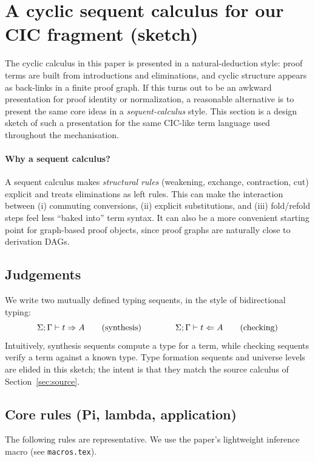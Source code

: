 \section{A cyclic sequent calculus for our CIC fragment (sketch)}
\label{sec:cyclic-sequent}

The cyclic calculus in this paper is presented in a natural-deduction style: proof terms are built from introductions and eliminations, and cyclic structure appears as back-links in a finite proof graph.
If this turns out to be an awkward presentation for proof identity or normalization, a reasonable alternative is to present the same core ideas in a \emph{sequent-calculus} style.
This section is a design sketch of such a presentation for the same CIC-like term language used throughout the mechanisation.

\paragraph{Why a sequent calculus?}
A sequent calculus makes \emph{structural rules} (weakening, exchange, contraction, cut) explicit and treats eliminations as left rules.
This can make the interaction between (i) commuting conversions, (ii) explicit substitutions, and (iii) fold/refold steps feel less ``baked into'' term syntax.
It can also be a more convenient starting point for graph-based proof objects, since proof graphs are naturally close to derivation DAGs.

\subsection{Judgements}

We write two mutually defined typing sequents, in the style of bidirectional typing:
\[
  \Sigma;\Gamma \vdash t \Rightarrow A
  \qquad\text{(synthesis)}
  \qquad\qquad
  \Sigma;\Gamma \vdash t \Leftarrow A
  \qquad\text{(checking)}
\]
Intuitively, synthesis sequents compute a type for a term, while checking sequents verify a term against a known type.
Type formation sequents and universe levels are elided in this sketch; the intent is that they match the source calculus of Section~\ref{sec:source}.

\subsection{Core rules (Pi, lambda, application)}

The following rules are representative.
We use the paper's lightweight inference macro \texttt{\detokenize{\Infer}} (see \texttt{macros.tex}).

